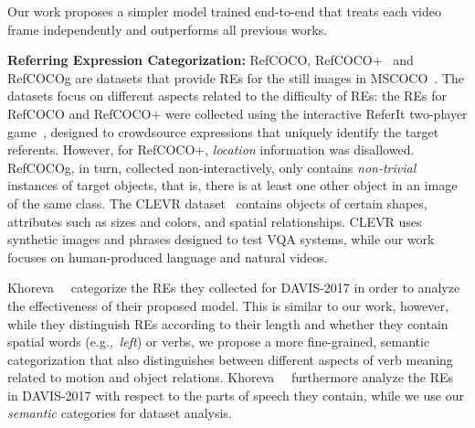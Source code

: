 \documentclass[10pt,twocolumn,letterpaper]{article}
\begin{document}
Our work proposes a simpler model trained end-to-end that treats each video frame independently and outperforms all previous works.


\noindent
\textbf{Referring Expression Categorization:}
RefCOCO, RefCOCO+~\cite{yu2016modeling} and RefCOCOg \cite{mao2015generation} are datasets that provide REs for the still images in MSCOCO~\cite{lin2014mscoco}. 
The datasets focus on different aspects related to the difficulty of REs: 
the REs for RefCOCO and RefCOCO+ were collected using the interactive ReferIt two-player game~\cite{kazemzadeh2014referitgame}, designed to crowdsource expressions that uniquely identify the target referents. 
However, for RefCOCO+, \textit{location} information was disallowed. 
RefCOCOg, in turn, collected  non-interactively, only contains \textit{non-trivial} instances of target objects, that is, there is at least one other object in an image of the same class. 
The CLEVR dataset~\cite{johnson2017clevr} contains objects of certain shapes, attributes such as sizes and colors, and spatial relationships. 
CLEVR uses synthetic images and phrases designed to test VQA systems, while our work focuses on human-produced language and natural videos. 


Khoreva~\etal~\cite{khoreva2018video} categorize the REs they collected for DAVIS-2017 in order to analyze the effectiveness of their proposed model. 
This is similar to our work, however, while they distinguish  REs according to their length  and whether they contain spatial words (e.g.,~\textit{left}) or verbs, we propose a more fine-grained, semantic categorization that also distinguishes between different aspects of verb meaning related to motion and object relations. 
Khoreva~\etal~\cite{khoreva2018video}  furthermore analyze the REs in DAVIS-2017 with respect to the parts of speech they contain, while we use our \textit{semantic} categories for dataset analysis. 
\end{document}
